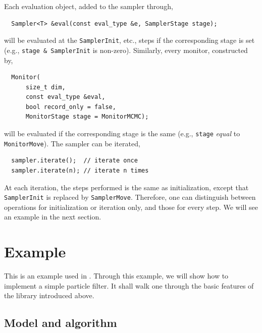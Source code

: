 Each evaluation object, added to the sampler through,
\begin{Verbatim}
  Sampler<T> &eval(const eval_type &e, SamplerStage stage);
\end{Verbatim}
will be evaluated at the \verb|SamplerInit|, etc., steps if the corresponding
stage is set (e.g., \verb|stage & SamplerInit| is non-zero). Similarly, every
monitor, constructed by,
\begin{Verbatim}
  Monitor(
      size_t dim,
      const eval_type &eval,
      bool record_only = false,
      MonitorStage stage = MonitorMCMC);
\end{Verbatim}
will be evaluated if the corresponding stage is the same (e.g., \verb|stage|
\emph{equal} to \verb|MonitorMove|). The sampler can be iterated,
\begin{Verbatim}
  sampler.iterate();  // iterate once
  sampler.iterate(n); // iterate n times
\end{Verbatim}
At each iteration, the steps performed is the same as initialization, except
that \verb|SamplerInit| is replaced by \verb|SamplerMove|. Therefore, one can
distinguish between operations for initialization or iteration only, and those
for every step. We will see an example in the next section.

\section{Example}
\label{sec:Example (PF)}

This is an example used in \cite{Johansen:2009wd}. Through this example, we
will show how to implement a simple particle filter. It shall walk one through
the basic features of the library introduced above.

\subsection{Model and algorithm}
\label{sub:Model and algorithm}

